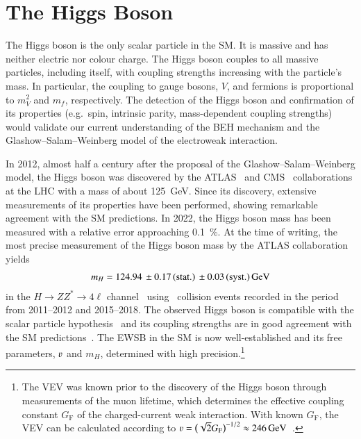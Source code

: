 \section{The Higgs Boson}%
\label{sec:higgs_boson}

The Higgs boson is the only scalar particle in the SM. It is massive and has
neither electric nor colour charge. The Higgs boson couples to all massive
particles, including itself, with coupling strengths increasing with the
particle's mass. In particular, the coupling to gauge bosons, $V$, and fermions
is proportional to $m_V^2$ and $m_f$, respectively.
The detection of the Higgs boson and confirmation of its
properties (e.g.\ spin, intrinsic parity, mass-dependent coupling strengths)
would validate our current understanding of the BEH mechanism and the
Glashow--Salam--Weinberg model of the electroweak interaction.

In 2012, almost half a century after the proposal of the
Glashow--Salam--Weinberg model, the Higgs boson was discovered by the
ATLAS~\cite{HIGG-2012-27} and CMS~\cite{CMS-HIG-12-028} collaborations at the
LHC with a mass of about \SI{125}{\GeV}. Since its discovery, extensive
measurements of its properties have been performed, showing remarkable agreement
with the SM predictions. In 2022, the Higgs boson mass has been measured with a
relative error approaching \SI{0.1}{\percent}. At the time of writing, the most
precise measurement of the Higgs boson mass by the ATLAS collaboration yields
\begin{align*}
  m_{H} = \num{124.94}%
  \valuesep\numerrt{0.17}{stat.}%
  \valuesep\numerrt{0.03}{syst.}%
  \valuesep\si{\GeV}
\end{align*}
in the $H \to Z Z^{*} \to 4\ell$ channel~\cite{HIGG-2020-07} using \pp~collision
events recorded in the period from 2011--2012 and 2015--2018. The observed Higgs
boson is compatible with the scalar particle
hypothesis~\cite{HIGG-2013-17-witherratum,CMS-HIG-14-018} and its coupling
strengths are in good agreement with the SM
predictions~\cite{HIGG-2021-23,CMS-HIG-22-001}. The EWSB in the SM is now
well-established and its free parameters, $\varv$ and $m_{H}$, determined with
high precision.\footnote{The VEV was known prior to the discovery of the Higgs
  boson through measurements of the muon lifetime, which determines the
  effective coupling constant $G_{\text{F}}$ of the charged-current weak
  interaction. With known $G_{\text{F}}$, the VEV can be calculated according to
  $\varv = \bigl( \sqrt{2} G_{\text{F}} \bigr)^{-1/2} \approx
  \SI{246}{\GeV}$~\cite{MuLan:2010shf}.}


